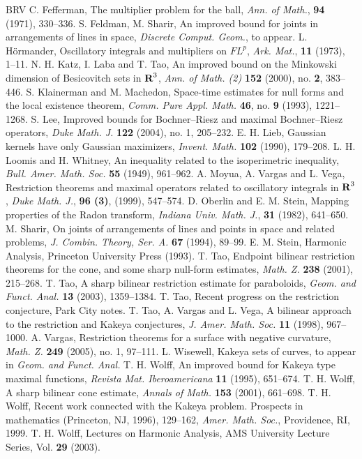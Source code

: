 \begin{thebibliography}{BRV}
 C. Fefferman, The multiplier problem for the ball,
\textit{Ann. of Math.}, {\bf 94} (1971), 330--336.
S. Feldman, M. Sharir, An improved bound for joints in
arrangements of lines in space, \textit{Discrete Comput. Geom.},
to appear.
 L. H\"ormander, Oscillatory integrals and
multipliers on $FL^p$, \textit{Ark. Mat.}, {\bf 11} (1973), 1--11.
 N. H. Katz, I. Laba and T. Tao,
An improved bound on the Minkowski dimension of Besicovitch sets
in ${\hbox{\bf R}}\sp 3$, \textit{Ann. of Math. (2)} {\bf 152} (2000), no.
{\bf 2}, 383--446.
 S. Klainerman and M. Machedon, Space-time estimates
for null forms and the local existence theorem, \textit{Comm. Pure
Appl. Math.} {\bf 46}, no. {\bf 9} (1993), 1221--1268.
 S. Lee, Improved bounds for Bochner--Riesz and maximal Bochner--Riesz operators, \textit{Duke Math. J.} {\bf 122} (2004), no. 1, 205--232.
 E. H. Lieb, Gaussian kernels have only Gaussian
maximizers, \textit{Invent. Math.} {\bf 102} (1990), 179--208.
 L. H. Loomis and H. Whitney,
An inequality related to the isoperimetric inequality,
\textit{Bull. Amer. Math. Soc.} {\bf 55} (1949), 961--962.
 A. Moyua, A. Vargas and L. Vega, Restriction
theorems and maximal operators related to oscillatory integrals in
${\hbox{\bf R}}^{3}$, \textit{Duke Math. J.}, {\bf 96 (3)}, (1999), 547--574.
 D. Oberlin and E. M. Stein, Mapping properties of the Radon
transform, \textit{Indiana Univ. Math. J.}, {\bf 31} (1982),
641--650.
M. Sharir, On joints of arrangements of lines and points in space
and related problems, \textit{J. Combin. Theory, Ser. A.}
\textbf{67} (1994), 89--99.
 E. M. Stein, Harmonic Analysis, Princeton University
Press (1993).
 T. Tao,
Endpoint bilinear restriction theorems for the cone, and some sharp
null-form estimates, \textit{Math. Z.} {\bf 238} (2001), 215--268.
 T. Tao, A sharp bilinear restriction estimate for
paraboloids, \textit{Geom. and Funct. Anal.} {\bf 13} (2003), 1359--1384.
 T. Tao, Recent progress on the restriction
conjecture, Park City notes.
 T. Tao, A. Vargas and L. Vega,
A bilinear approach to the restriction and Kakeya conjectures,
\textit{J. Amer. Math. Soc.} {\bf 11} (1998), 967--1000.
 A. Vargas, Restriction theorems for a surface with
negative curvature, \textit{Math. Z.} {\bf 249} (2005), no. 1, 97--111.
 L. Wisewell, Kakeya sets of curves, to appear
in \textit{Geom. and Funct. Anal.}
 T. H. Wolff,
An improved bound for Kakeya type maximal functions,
\textit{Revista Mat. Iberoamericana} {\bf 11} (1995), 651--674.
 T. H. Wolff, A sharp bilinear cone estimate,
\textit{Annals of Math.} {\bf 153} (2001), 661--698.
T. H. Wolff, Recent work connected with the Kakeya problem. Prospects
in mathematics (Princeton, NJ, 1996), 129--162, \textit{Amer.
Math. Soc.}, Providence, RI, 1999.
 T. H. Wolff, Lectures on Harmonic Analysis,
AMS University Lecture Series, Vol. {\bf 29} (2003).
\end{thebibliography}

